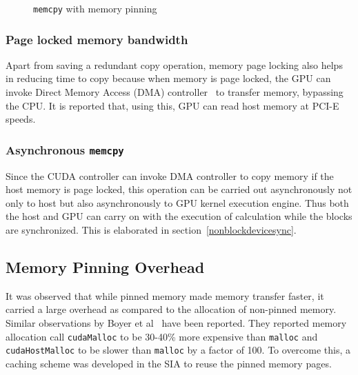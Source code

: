 \begin{figure}[h] %
  \caption{\texttt{memcpy} with memory pinning}\label{fig:w_mem_pin}
\end{figure}

\subsubsection{Page locked memory bandwidth}
Apart from saving a redundant copy operation, memory page locking also helps in
reducing time to copy because when memory is page locked, the GPU can invoke Direct
Memory Access (DMA)
controller~\cite{dmatransfer, whypinnedfast, teslaspecs, teslakspecs}
to transfer memory, bypassing the CPU. It is reported\cite{Kaldewey:2012:GJP:2236584.2236592}
that, using this, GPU can read host memory at PCI-E speeds.

\subsubsection{Asynchronous \texttt{memcpy}}
Since the CUDA controller can invoke DMA controller to copy memory if the host memory
is page locked, this operation can be carried out asynchronously not only to host but
also asynchronously to GPU kernel execution engine. Thus both the host and GPU can carry
on with the execution of calculation while the blocks are synchronized. This is
elaborated in section~\ref{nonblockdevicesync}.

\subsection{Memory Pinning Overhead}
It was observed that while pinned memory made memory transfer faster, it carried
a large overhead as compared to the allocation of non-pinned memory. Similar observations
by Boyer et al~\cite{Boyer2009, memory-management-overhead, pinned-tradeoff}
have been reported. They reported memory allocation call \texttt{cudaMalloc} to
be 30-40\% more expensive than \texttt{malloc} and \texttt{cudaHostMalloc} to be
slower than \texttt{malloc} by a factor of 100. To overcome this, a caching scheme was
developed in the SIA to reuse the pinned memory pages.

